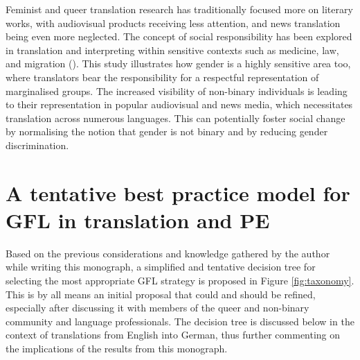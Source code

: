 Feminist and queer translation research has traditionally focused more on literary works, with audiovisual products receiving less attention, and news translation being even more neglected. The concept of social responsibility has been explored in translation and interpreting within sensitive contexts such as medicine, law, and migration (\cite{drugan2017translation}). This study illustrates how gender is a highly sensitive area too, where translators bear the responsibility for a respectful representation of marginalised groups. The increased visibility of non-binary individuals is leading to their representation in popular audiovisual and news media, which necessitates translation across numerous languages. This can potentially foster social change by normalising the notion that gender is not binary and by reducing gender discrimination.



\section{A tentative best practice model for GFL in translation and PE}
Based on the previous considerations and knowledge gathered by the author while writing this monograph, a simplified and tentative decision tree for selecting the most appropriate GFL strategy is proposed in Figure \ref{fig:taxonomy}. This is by all means an initial proposal that could and should be refined, especially after discussing it with members of the queer and non-binary community and language professionals. The decision tree is discussed below in the context of translations from English into German, thus further commenting on the implications of the results from this monograph.


